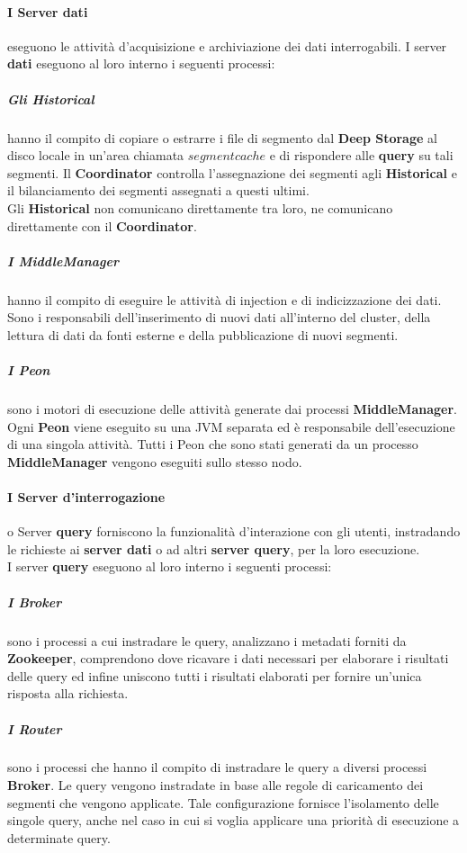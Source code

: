 \paragraph{I Server dati} eseguono le attività d'acquisizione e archiviazione dei dati interrogabili.
I server \textbf{dati} eseguono al loro interno i seguenti processi:
\subparagraph{Gli Historical} hanno il compito di copiare o estrarre i file di segmento dal \textbf{Deep Storage} al disco locale in un’area
chiamata $segment cache$ e di rispondere alle \textbf{query} su tali segmenti.
Il \textbf{Coordinator} controlla l’assegnazione dei segmenti agli \textbf{Historical} e il bilanciamento dei segmenti assegnati
a questi ultimi.\\ 
Gli \textbf{Historical} non comunicano direttamente tra loro, ne comunicano direttamente con il \textbf{Coordinator}. 
\subparagraph{I MiddleManager} 
hanno il compito di eseguire le attività di \gls{injection}{} e di indicizzazione dei dati.\\
Sono i responsabili dell'inserimento di nuovi dati all'interno del \gls{cluster}{}, della lettura di dati da fonti esterne e della pubblicazione di 
nuovi segmenti.\\
\subparagraph{I Peon} sono i motori di esecuzione delle attività generate dai processi \textbf{MiddleManager}. \\
Ogni \textbf{Peon} viene eseguito su una JVM separata ed è responsabile dell’esecuzione di una singola attività. 
Tutti i Peon che sono stati generati da un processo \textbf{MiddleManager} vengono eseguiti sullo stesso nodo.
\paragraph{I Server d'interrogazione} o Server \textbf{query} forniscono la funzionalità d'interazione con gli utenti, instradando le richieste  
ai \textbf{server dati} o ad altri \textbf{server query}, per la loro esecuzione. \\
I server \textbf{query} eseguono al loro interno i seguenti processi:
\subparagraph{I Broker} sono i processi a cui instradare le query, analizzano i \gls{metadati}{} forniti
da \textbf{Zookeeper}, comprendono dove ricavare i dati necessari per elaborare i risultati delle query ed 
infine uniscono tutti i risultati elaborati per fornire un’unica risposta alla richiesta.\\
\subparagraph{I Router} sono i processi che hanno il compito di instradare le query a diversi processi \textbf{Broker}. Le query
vengono instradate in base alle regole di caricamento dei segmenti che vengono applicate.
Tale configurazione fornisce l’isolamento delle singole query, anche nel caso in cui si voglia applicare 
una priorità di esecuzione a determinate query.\\
